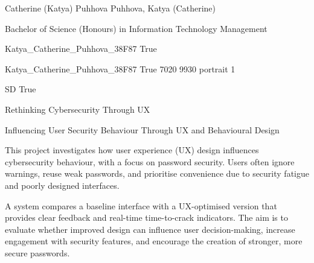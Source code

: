 \documentclass[twoside]{report}
\begin{document}
\begingroup{}\relax



\def\Key{Katya_Catherine_Puhhova_38F87}

{Catherine (Katya) Puhhova}
{Puhhova, Katya (Catherine)}

{Bachelor of Science (Honours) in Information Technology Management}

{Katya_Catherine_Puhhova_38F87}
{True}

{Katya_Catherine_Puhhova_38F87}
{True}
{7020}
{9930}
{portrait}
{1}

{SD}
{True}

{Rethinking Cybersecurity Through UX}

{Influencing User Security Behaviour Through UX and Behavioural Design}

{This project investigates how user experience (UX) design influences cybersecurity behaviour, with a focus on password security. Users often ignore warnings, reuse weak passwords, and prioritise convenience due to security fatigue and poorly designed interfaces.

A system compares a baseline interface with a UX-optimised version that provides clear feedback and real-time time-to-crack indicators. The aim is to evaluate whether improved design can influence user decision-making, increase engagement with security features, and encourage the creation of stronger, more secure passwords.}
\end{document}
